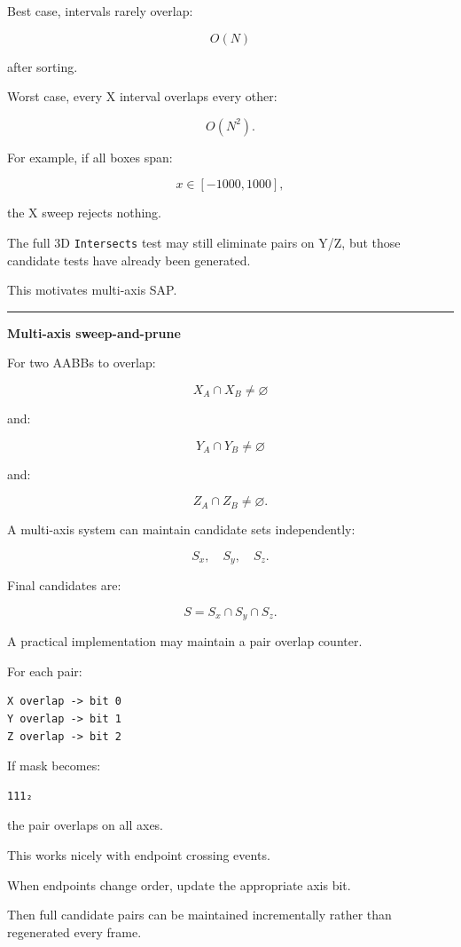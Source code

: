 Best case, intervals rarely overlap:

\[
O(N)
\]

after sorting.

Worst case, every X interval overlaps every other:

\[
O(N^2).
\]

For example, if all boxes span:

\[
x\in[-1000,1000],
\]

the X sweep rejects nothing.

The full 3D \texttt{Intersects} test may still eliminate pairs on Y/Z, but those candidate tests have already been generated.

This motivates multi-axis SAP.

\begin{center}\rule{0.5\linewidth}{0.5pt}\end{center}

\textbf{Multi-axis sweep-and-prune}

For two AABBs to overlap:

\[
X_A\cap X_B\ne\varnothing
\]

and:

\[
Y_A\cap Y_B\ne\varnothing
\]

and:

\[
Z_A\cap Z_B\ne\varnothing.
\]

A multi-axis system can maintain candidate sets independently:

\[
S_x,\quad S_y,\quad S_z.
\]

Final candidates are:

\[
\boxed{
S=S_x\cap S_y\cap S_z.
}
\]

A practical implementation may maintain a pair overlap counter.

For each pair:

\begin{verbatim}
X overlap -> bit 0
Y overlap -> bit 1
Z overlap -> bit 2
\end{verbatim}

If mask becomes:

\begin{verbatim}
111₂
\end{verbatim}

the pair overlaps on all axes.

This works nicely with endpoint crossing events.

When endpoints change order, update the appropriate axis bit.

Then full candidate pairs can be maintained incrementally rather than regenerated every frame.

